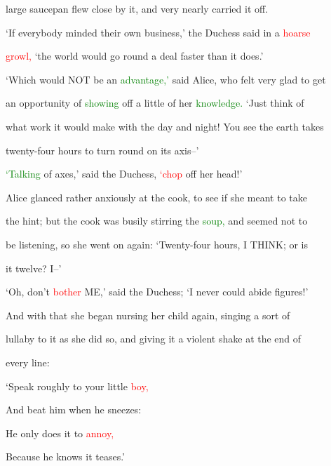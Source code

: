  large saucepan flew close by it, and very nearly carried it off.



 ‘If everybody minded their own business,’ the Duchess said in a \textcolor{red}{hoarse}

 \textcolor{red}{growl,} ‘the world would go round a \textcolor{BurntOrange}{deal} faster than it does.’



 ‘Which would NOT be an \textcolor{green}{advantage,’} said Alice, who felt very \textcolor{BurntOrange}{glad} to get

 an \textcolor{BurntOrange}{opportunity} of \textcolor{green}{showing} off a little of her \textcolor{green}{knowledge.} ‘Just think of

 what work it would make with the day and night! You see the earth takes

 twenty-four hours to turn round on its axis--’



 \textcolor{green}{‘Talking} of axes,’ said the Duchess, \textcolor{red}{‘chop} off her head!’



 Alice glanced rather anxiously at the cook, to see if she meant to take

 the hint; but the cook was busily stirring the \textcolor{green}{soup,} and seemed not to

 be listening, so she went on again: ‘Twenty-four hours, I THINK; or is

 it twelve? I--’



 ‘Oh, don’t \textcolor{red}{bother} ME,’ said the Duchess; ‘I never could abide figures!’

 And with that she began nursing her \textcolor{BurntOrange}{child} again, \textcolor{BurntOrange}{singing} a sort of

 lullaby to it as she did so, and giving it a \textcolor{BurntOrange}{violent} shake at the end of

 every line:



 ‘Speak roughly to your little \textcolor{red}{boy,}

 And beat him when he \textcolor{BurntOrange}{sneezes:}

 He only does it to \textcolor{red}{annoy,}

 Because he knows it \textcolor{BurntOrange}{teases.’}



